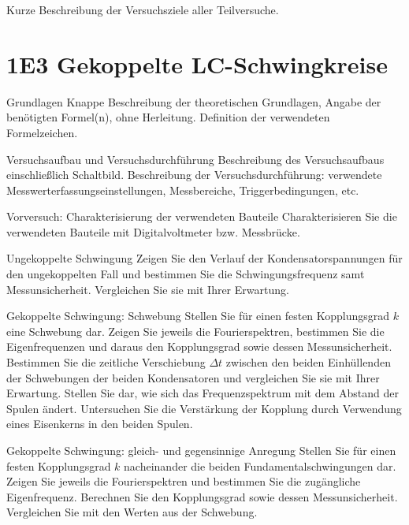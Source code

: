 \documentclass[twoside]{protokoll}
\begin{document}
\begin{versuchsziele}
  Kurze Beschreibung der Versuchsziele aller Teilversuche.
\end{versuchsziele}

\section{1E3 Gekoppelte LC-Schwingkreise}

\begin{aufgabe}{Grundlagen}
  Knappe Beschreibung der theoretischen Grundlagen, Angabe der
  benötigten Formel(n), ohne Herleitung. Definition der verwendeten
  Formelzeichen.
\end{aufgabe}




\begin{aufgabe}{Versuchsaufbau und Versuchsdurchführung}
  Beschreibung des Versuchsaufbaus einschließlich
  Schaltbild. Beschreibung der Versuchsdurchführung: verwendete
  Messwerterfassungseinstellungen, Messbereiche, Triggerbedingungen,
  etc.
\end{aufgabe}


\begin{aufgabe}{Vorversuch: Charakterisierung der verwendeten Bauteile}
  Charakterisieren Sie die verwendeten Bauteile mit Digitalvoltmeter
  bzw. Messbrücke.
\end{aufgabe}


\begin{aufgabe}{Ungekoppelte Schwingung}
  Zeigen Sie den Verlauf der Kondensatorspannungen für den
  ungekoppelten Fall und bestimmen Sie die Schwingungsfrequenz samt
  Messunsicherheit. Vergleichen Sie sie mit Ihrer Erwartung.
\end{aufgabe}


\begin{aufgabe}{Gekoppelte Schwingung: Schwebung}
  Stellen Sie für einen festen Kopplungsgrad $k$ eine Schwebung
  dar. Zeigen Sie jeweils die Fourierspektren, bestimmen Sie die
  Eigenfrequenzen und daraus den Kopplungsgrad sowie dessen
  Messunsicherheit. Bestimmen Sie die zeitliche Verschiebung
  $\Delta{}t$ zwischen den beiden Einhüllenden der Schwebungen der
  beiden Kondensatoren und vergleichen Sie sie mit Ihrer
  Erwartung. Stellen Sie dar, wie sich das Frequenzspektrum mit dem
  Abstand der Spulen ändert. Untersuchen Sie die Verstärkung der
  Kopplung durch Verwendung eines Eisenkerns in den beiden Spulen.
\end{aufgabe}


\begin{aufgabe}{Gekoppelte Schwingung: gleich- und gegensinnige Anregung}
  Stellen Sie für einen festen Kopplungsgrad $k$ nacheinander die
  beiden Fundamentalschwingungen dar. Zeigen Sie jeweils die
  Fourierspektren und bestimmen Sie die zugängliche
  Eigenfrequenz. Berechnen Sie den Kopplungsgrad sowie dessen
  Messunsicherheit. Vergleichen Sie mit den Werten aus der Schwebung.
\end{aufgabe}
 
 
\end{document}
